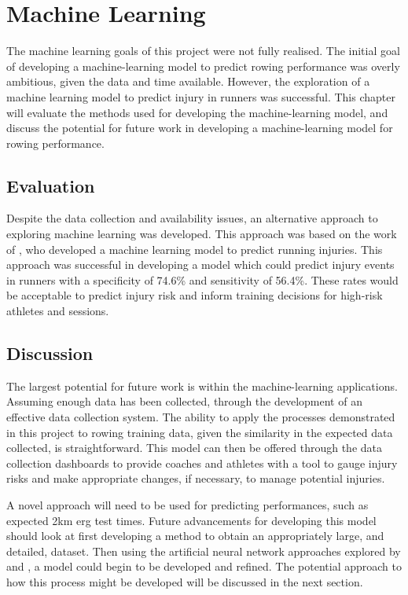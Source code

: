 \section{Machine Learning}
The machine learning goals of this project were not fully realised. The initial goal of developing a machine-learning model to predict rowing performance was overly ambitious, given the data and time available. However, the exploration of a machine learning model to predict injury in runners was successful. This chapter will evaluate the methods used for developing the machine-learning model, and discuss the potential for future work in developing a machine-learning model for rowing performance.

\subsection{Evaluation}
Despite the data collection and availability issues, an alternative approach to exploring machine learning was developed. This approach was based on the work of \textcite{Lovdal2021}, who developed a machine learning model to predict running injuries. This approach was successful in developing a model which could predict injury events in runners with a specificity of 74.6\% and sensitivity of 56.4\%. These rates would be acceptable to predict injury risk and inform training decisions for high-risk athletes and sessions.  

\subsection{Discussion}
The largest potential for future work is within the machine-learning applications. Assuming enough data has been collected, through the development of an effective data collection system. The ability to apply the processes demonstrated in this project to rowing training data, given the similarity in the expected data collected, is straightforward. This model can then be offered through the data collection dashboards to provide coaches and athletes with a tool to gauge injury risks and make appropriate changes, if necessary, to manage potential injuries.

A novel approach will need to be used for predicting performances, such as expected 2km erg test times. Future advancements for developing this model should look at first developing a method to obtain an appropriately large, and detailed, dataset. Then using the artificial neural network approaches explored by \textcite{Edelmannnusser2002} and \textcite{Churchill2014}, a model could begin to be developed and refined. The potential approach to how this process might be developed will be discussed in the next section.

